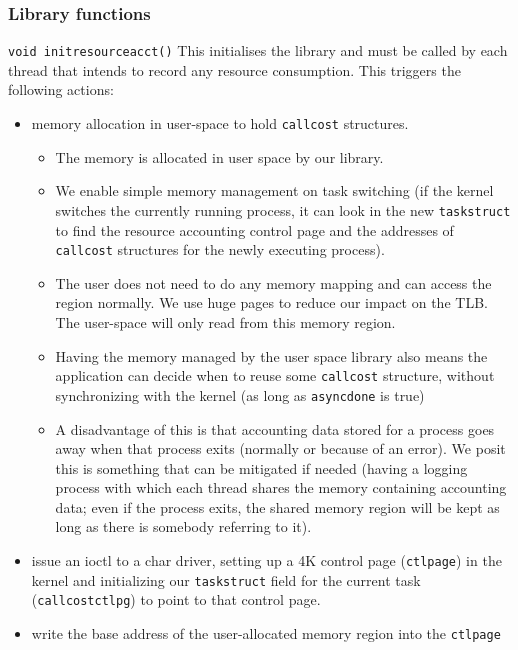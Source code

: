 \documentclass[12pt]{article}
\def\_{\textunderscore\-}
\begin{document}
\subsubsection{Library functions}
{\color{blue}\texttt{void init\_resource\_acct()}} This initialises the library and must be called by each thread that intends to record any resource consumption. This triggers the following actions:
\begin{itemize}
\item memory allocation in user-space to hold \texttt{call\_cost} structures.
	\begin{itemize}
	\item The memory is allocated in user space by our library.
	\item We enable simple memory management on task switching (if the kernel switches the currently running process, it can look in the new \texttt{task\_struct} to find the resource accounting control page and the addresses of \texttt{call\_cost} structures for the newly executing process).
	\item The user does not need to do any memory mapping and can access the region normally. We use huge pages to reduce our impact on the TLB. The user-space will only read from this memory region.
	\item Having the memory managed by the user space library also means the application can decide when to reuse some \texttt{call\_cost} structure, without synchronizing with the kernel (as long as \texttt{async\_done} is true)
	\item A disadvantage of this is that accounting data stored for a process goes away when that process exits (normally or because of an error). We posit this is something that can be mitigated if needed (having a logging process with which each thread shares the memory containing accounting data; even if the process exits, the shared memory region will be kept as long as there is somebody referring to it). 
	\end{itemize} 
\item issue an ioctl to a char driver, setting up a 4K control page (\texttt{ctl\_page}) in the kernel and initializing our \texttt{task\_struct} field for the current task (\texttt{call\_cost\_ctlpg}) to point to that control page.
\item write the base address of the user-allocated memory region into the \texttt{ctl\_page}
\end{itemize}
\end{document}
